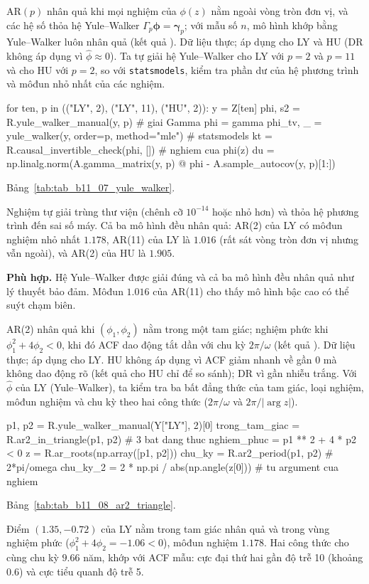  AR$(p)$ nhân quả khi mọi nghiệm của $\phi(z)$ nằm ngoài vòng tròn đơn vị, và các hệ số thỏa hệ Yule--Walker $\Gamma_p\boldsymbol\phi=\boldsymbol\gamma_p$; với mẫu số $n$, mô hình khớp bằng Yule--Walker luôn nhân quả (kết quả ).
 Dữ liệu thực; áp dụng cho LY và HU (DR không áp dụng vì $\hat\phi\approx0$). Ta tự giải hệ Yule--Walker cho LY với $p=2$ và $p=11$ và cho HU với $p=2$, so với \texttt{statsmodels}, kiểm tra phần dư của hệ phương trình và môđun nhỏ nhất của các nghiệm.
\begin{codeblock}
for ten, p in (("LY", 2), ("LY", 11), ("HU", 2)):
    y = Z[ten]
    phi, s2 = R.yule_walker_manual(y, p)                    # giai Gamma phi = gamma
    phi_tv, _ = yule_walker(y, order=p, method="mle")       # statsmodels
    kt = R.causal_invertible_check(phi, [])                 # nghiem cua phi(z)
    du = np.linalg.norm(A.gamma_matrix(y, p) @ phi - A.sample_autocov(y, p)[1:])
\end{codeblock}
 Bảng~\ref{tab:tab_b11_07_yule_walker}.

 Nghiệm tự giải trùng thư viện (chênh cỡ $10^{-14}$ hoặc nhỏ hơn) và thỏa hệ phương trình đến sai số máy. Cả ba mô hình đều nhân quả: AR(2) của LY có môđun nghiệm nhỏ nhất $1.178$, AR(11) của LY là $1.016$ (rất sát vòng tròn đơn vị nhưng vẫn ngoài), và AR(2) của HU là $1.905$.

 \textbf{Phù hợp.} Hệ Yule--Walker được giải đúng và cả ba mô hình đều nhân quả như lý thuyết bảo đảm. Môđun $1.016$ của AR(11) cho thấy mô hình bậc cao có thể suýt chạm biên.

 AR(2) nhân quả khi $(\phi_1,\phi_2)$ nằm trong một tam giác; nghiệm phức khi $\phi_1^2+4\phi_2<0$, khi đó ACF dao động tắt dần với chu kỳ $2\pi/\omega$ (kết quả ).
 Dữ liệu thực; áp dụng cho LY. HU không áp dụng vì ACF giảm nhanh về gần $0$ mà không dao động rõ (kết quả cho HU chỉ để so sánh); DR vì gần nhiễu trắng. Với $\hat\phi$ của LY (Yule--Walker), ta kiểm tra ba bất đẳng thức của tam giác, loại nghiệm, môđun nghiệm và chu kỳ theo hai công thức ($2\pi/\omega$ và $2\pi/|\arg z|$).
\begin{codeblock}
p1, p2 = R.yule_walker_manual(Y["LY"], 2)[0]
trong_tam_giac = R.ar2_in_triangle(p1, p2)         # 3 bat dang thuc
nghiem_phuc = p1 ** 2 + 4 * p2 < 0
z = R.ar_roots(np.array([p1, p2]))
chu_ky = R.ar2_period(p1, p2)                      # 2*pi/omega
chu_ky_2 = 2 * np.pi / abs(np.angle(z[0]))         # tu argument cua nghiem
\end{codeblock}
 Bảng~\ref{tab:tab_b11_08_ar2_triangle}.

 Điểm $(1.35,-0.72)$ của LY nằm trong tam giác nhân quả và trong vùng nghiệm phức ($\phi_1^2+4\phi_2=-1.06<0$), môđun nghiệm $1.178$. Hai công thức cho cùng chu kỳ $9.66$ năm, khớp với ACF mẫu: cực đại thứ hai gần độ trễ 10 (khoảng $0.6$) và cực tiểu quanh độ trễ 5.

